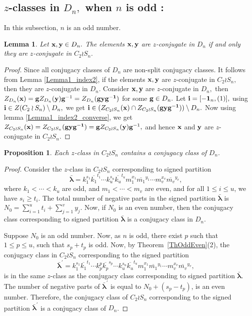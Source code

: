 \documentclass[12pt,twoside,reqno]{amsart}
\newtheorem{lemma}[theorem]{Lemma}
\newtheorem{proposition}[theorem]{Proposition}
\theoremstyle{definition}
\numberwithin{equation}{section}
\newcommand{\bmf}[1]{\mathbf{#1}}
\begin{document}
\subsection{$z$-classes in $D_n,$ when $n$ is odd :} In this subsection, $n$ is an odd number.
\begin{lemma}\label{LemmaOddWDn}
Let ${\bf x,y}\in D_n.$ The elements ${\bf x,y}$ are $z$-conjugate in $D_n$ if and only they are $z$-conjugate in $C_2 \wr S_n.$
\end{lemma}
\begin{proof}
Since all conjugacy classes of $D_n$ are non-split conjugacy classes. It follows from Lemma \ref{Lemma1_index2}, if the elements ${\bf x,y}$ are $z$-conjugate in $C_2 \wr S_n,$ then they are $z$-conjugate in $D_n.$
    Consider ${\bf x,y}$ are $z$-conjugate in $D_n,$ then 
    $Z_{D_n}({\bf x})= {\bf g}Z_{D_n}({\bf y}){\bf g}^{-1}=Z_{D_n}({\bf gyg^{-1}})$ for some ${\bf g}\in D_n.$ Let ${\bf i}=[-{\bf 1}_n, (1)],$ using ${\bf i}\in Z(C_2 \wr S_n)\setminus D_n,$  we get 
    ${\bf i}\in (Z_{C_2 \wr S_n}({\bf x})\cap Z_{C_2 \wr S_n}({\bf gyg^{-1}}))\setminus D_n.$
Now using lemma \ref{Lemma1_index2_converse}, we get $Z_{C_2 \wr S_n}({\bf x})= Z_{C_2 \wr S_n}({\bf gyg^{-1}})= {\bf g}Z_{C_2 \wr S_n}({\bf y}){\bf g}^{-1},$ and hence ${\bf x}$ and ${\bf y}$ are $z$-conjugate in $C_2 \wr S_n$.


\end{proof}

 \begin{proposition}\label{PropOddWD1}
Each $z$-class in $C_2 \wr S_n$ contains a conjugacy class of $D_n$. 
\end{proposition} 
\begin{proof}
Consider the $z$-class in $C_2 \wr S_n$ corresponding to signed partition $$\bmf{\bar\lambda} =k_1^{s_1}\overline{k_1}^{t_1}\cdots k_u^{s_u}\overline{k_u}^{t_u}m_1^{x_1}\overline{m_1}^{y_1}\cdots m_v^{x_v}\overline{m_v}^{y_v}, $$ where $k_1 < \cdots <k_u$ are odd, and $m_1 < \cdots < m_v$ are even, and for all $1 \leq i \leq u$, we have $s_i \geq t_i$. The total number of negative parts in the signed partition $\bmf{\bar\lambda}$ is $N_0=\sum_{i=1}^u t_i + \sum_{j=1}^v y_j$. Now, if $N_0$ is an even number, then the conjugacy class corresponding to signed partition $\bmf{\bar\lambda}$ is a conjugacy class in $D_n$. 

Suppose $N_0$ is an odd number. Now, as $n$ is odd, there exist $p$ such that $1\leq p \leq u$, such that $s_{p}+t_{p}$ is odd. Now, by Theorem~\ref{ThOddEven}(2), the conjugacy class in $C_2 \wr S_n$ corresponding to the signed partition
$$\bmf{\bar\lambda^\prime} =k_1^{s_1}\overline{k_1}^{t_1}\cdots k_{p}^{p}\overline{k_{p}}^{s_{p}}\cdots k_u^{s_u}\overline{k_u}^{t_u}m_1^{x_1}\overline{m_1}^{y_1}\cdots m_v^{x_v}\overline{m_v}^{y_v},$$
is in the same $z$-class as the conjugacy class  corresponding to signed partition $\bmf{\bar\lambda}$. The number of negative parts of $\bmf{\bar\lambda^\prime}$ is equal to $N_0 + (s_{p}-t_{p})$, is an even number. Therefore, the conjugacy class of $C_2 \wr S_n$ corresponding to the signed partition $\bmf{\bar\lambda^\prime}$ is a conjugacy class of $D_n$.

\end{proof}
\end{document}
